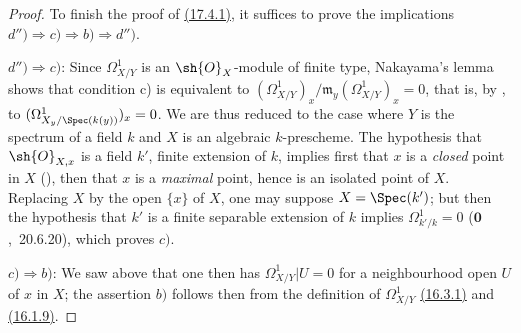 \begin{proof}
To finish the proof of {\hyperlink{ega4.c04.thm.17-4-1}{(17.4.1)}}, it suffices to prove the implications $d'')\Rightarrow c)\Rightarrow b)\Rightarrow d'')$.

$d'')\Rightarrow c)$: Since $\Omega^1_{X/Y}$ is an $\sh{O}_X$-module of finite type, Nakayama's lemma shows that condition c) is equivalent to $(\Omega^1_{X/Y})_x/\mathfrak{m}_y(\Omega^1_{X/Y})_x=0$, that is, by , to $(\Omega^1_{X_y/\Spec(k(y))})_x=0$.
We are thus reduced to the case where $Y$ is the spectrum of a field $k$ and $X$ is an algebraic $k$-prescheme.
The hypothesis that $\sh{O}_{X,x}$ is a field $k'$, finite extension of $k$, implies first that $x$ is a \emph{closed} point in $X$ (), then that $x$ is a \emph{maximal} point, hence is an isolated point of $X$.
Replacing $X$ by the open $\{x\}$ of $X$, one may suppose $X=\Spec(k')$; but then the hypothesis that $k'$ is a finite separable extension of $k$ implies $\Omega^1_{k'/k}=0$ ($\mathbf{0}$,~20.6.20), which proves $c)$.

$c)\Rightarrow b)$: We saw above that one then has $\Omega^1_{X/Y}|U=0$ for a neighbourhood open $U$ of $x$ in $X$; the assertion $b)$ follows then from the definition of $\Omega^1_{X/Y}$ {\hyperlink{ega4.c04.def.16-3-1}{(16.3.1)}} and {\hyperlink{ega4.c04.prop.16-1-9}{(16.1.9)}}.


\end{proof}
